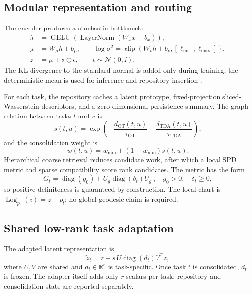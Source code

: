\documentclass[conference]{IEEEtran}
\begin{document}
\subsection{Modular representation and routing}

The encoder produces a stochastic bottleneck:
\begin{align}
h&=\operatorname{GELU}(\operatorname{LayerNorm}(W_xx+b_x)),\\
\mu&=W_\mu h+b_\mu,\qquad
\log\sigma^2=\operatorname{clip}(W_vh+b_v,[\ell_{\min},\ell_{\max}]),\\
z&=\mu+\sigma\odot\epsilon,\qquad \epsilon\sim\mathcal{N}(0,I).
\end{align}
The KL divergence to the standard normal is added only during training; the
deterministic mean is used for inference and repository insertion
\cite{alemi2017vib}.

For each task, the repository caches a latent prototype, fixed-projection
sliced-Wasserstein descriptors, and a zero-dimensional persistence summary.
The graph relation between tasks \(t\) and \(u\) is
\begin{equation}
s(t,u)=\exp\left(-\frac{d_{\mathrm{OT}}(t,u)}{\tau_{\mathrm{OT}}}
-\frac{d_{\mathrm{TDA}}(t,u)}{\tau_{\mathrm{TDA}}}\right),
\end{equation}
and the consolidation weight is
\begin{equation}
w(t,u)=w_{\min}+(1-w_{\min})s(t,u).
\end{equation}
Hierarchical coarse retrieval reduces candidate work, after which a local
SPD metric and sparse compatibility score rank candidates. The metric has
the form
\begin{equation}
G_t=\operatorname{diag}(g_0)+U_g\operatorname{diag}(\delta_t)U_g^\top,
\quad g_0>0,\quad \delta_t\geq 0,
\end{equation}
so positive definiteness is guaranteed by construction. The local chart is
\(\operatorname{Log}_{p_t}(z)=z-p_t\); no global geodesic claim is required.

\subsection{Shared low-rank task adaptation}

The adapted latent representation is
\begin{equation}
\widetilde z_t=z+s\,U\operatorname{diag}(d_t)V^\top z,
\end{equation}
where \(U,V\) are shared and \(d_t\in\mathbb{R}^r\) is task-specific. Once
task \(t\) is consolidated, \(d_t\) is frozen. The adapter itself adds only
\(r\) scalars per task; repository and consolidation state are reported
separately.
\end{document}
